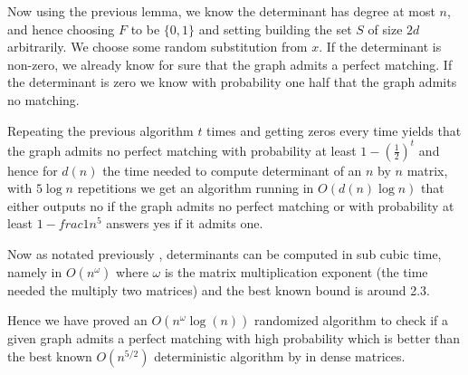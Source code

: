 	Now using the previous lemma, we know the determinant has degree at most $n$, and hence choosing $F$ to be $\{0, 1\}$ and setting building the set $S$ of size $2d$ arbitrarily. We choose some random substitution from $x$. If the determinant is non-zero, we already know for sure that the graph admits a perfect matching. If the determinant is zero we know with probability one half that the graph admits no matching.

	Repeating the previous algorithm $t$ times and getting zeros every time yields that the graph admits no perfect matching with probability at least $1 - (\frac{1}{2})^t$ and hence for $d(n)$ the time needed to compute determinant of an $n$ by $n$ matrix, with $5 \log n$ repetitions we get an algorithm running in $O(d(n) \log n)$ that either outputs no if the graph admits no perfect matching or with probability at least $1 - frac{1}{n^5}$ answers yes if it admits one.

	Now as notated previously \cite{aho1974design}, determinants can be computed in sub cubic time, namely in  $O(n^\omega)$ where $\omega$ is the matrix multiplication exponent (the time needed the multiply two matrices) and the best known bound is around 2.3.

	Hence we have proved an $O(n^{\omega} \log(n))$ randomized algorithm to check if a given graph admits a perfect matching with high probability which is better than the best known $O(n^{5/2})$ deterministic algorithm by \cite{micali1980v} in dense matrices.
